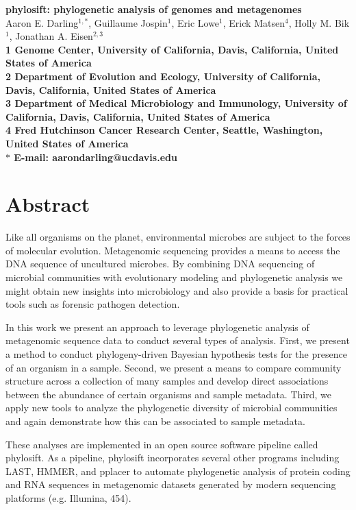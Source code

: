 \documentclass[10pt]{article}
\date{}
\begin{document}
\begin{flushleft}
{\Large
\textbf{phylosift: phylogenetic analysis of genomes and metagenomes}
}
\\
Aaron E. Darling$^{1,\ast}$,
Guillaume Jospin$^{1}$, 
Eric Lowe$^{1}$, 
Erick Matsen$^{4}$, 
Holly M. Bik$^{1}$,
Jonathan A. Eisen$^{2,3}$
\\
\bf{1} Genome Center, University of California, Davis, California, United States of America
\\
\bf{2} Department of Evolution and Ecology, University of California, Davis, California, United States of America
\\
\bf{3} Department of Medical Microbiology and Immunology, University of California, Davis, California, United States of America
\\
\bf{4} Fred Hutchinson Cancer Research Center, Seattle, Washington, United States of America
\\
$\ast$ E-mail: aarondarling@ucdavis.edu
\end{flushleft}

\section*{Abstract}
Like all organisms on the planet, environmental microbes are subject to the forces of molecular evolution.
Metagenomic sequencing provides a means to access the DNA sequence of uncultured microbes.
By combining DNA sequencing of microbial communities with evolutionary modeling and phylogenetic analysis we might obtain new insights into microbiology and also provide a basis for practical tools such as forensic pathogen detection.

In this work we present an approach to leverage phylogenetic analysis of metagenomic sequence data to conduct several types of analysis. 
First, we present a method to conduct phylogeny-driven Bayesian hypothesis tests for the presence of an organism in a sample. 
Second, we present a means to compare community structure across a collection of many samples and develop direct associations between the abundance of certain organisms and sample metadata.
Third, we apply new tools to analyze the phylogenetic diversity of microbial communities and again demonstrate how this can be associated to sample metadata.

These analyses are implemented in an open source software pipeline called phylosift.
As a pipeline, phylosift incorporates several other programs including LAST, HMMER, and pplacer to automate phylogenetic analysis of protein coding and RNA sequences in metagenomic datasets generated by modern sequencing platforms (e.g. Illumina, 454).
\end{document}
